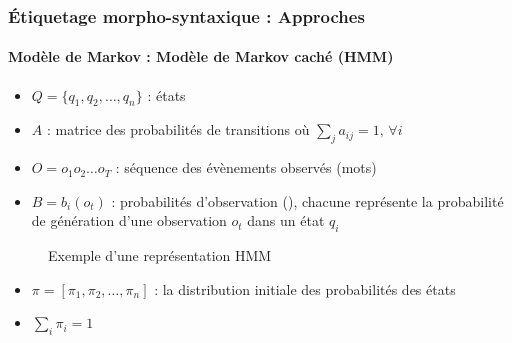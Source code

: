\documentclass[xcolor=table]{beamer}
\begin{document}
\begin{frame}[fragile]
\frametitle{Étiquetage morpho-syntaxique : Approches}
\framesubtitle{Modèle de Markov : Modèle de Markov caché (HMM)}

\begin{minipage}{.54\textwidth}
	\begin{itemize}
		\item $Q = \{q_1, q_2, \ldots, q_n\}$ : états
		\item $A$ : matrice des probabilités de transitions où $\sum_j a_{ij} = 1,\, \forall i$
		\item $O = o_1 o_2 \ldots o_T$ : séquence des évènements observés (mots)
		\item $B = b_i(o_t)$ : probabilités d'observation (), chacune représente la probabilité de génération d'une observation $o_t$ dans un état $q_i$
	\end{itemize}
\end{minipage}
\begin{minipage}{.45\textwidth}
	\begin{figure}
		\caption{Exemple d'une représentation HMM \cite{2019-jurafsky-martin}}
	\end{figure}
\end{minipage}

\begin{itemize}
	\item $\pi = [\pi_1, \pi_2, \ldots, \pi_n ]$ : la distribution initiale des probabilités des états
	\item $\sum_i \pi_i = 1$
\end{itemize}

\end{frame}
\end{document}
